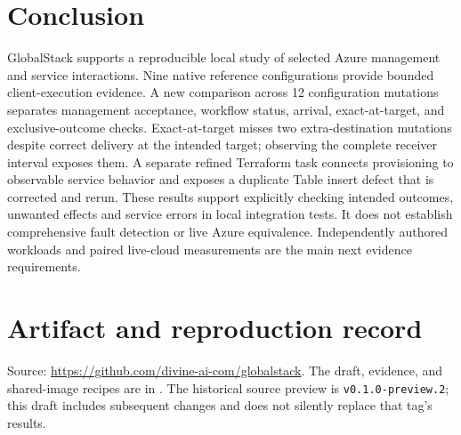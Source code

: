 \documentclass[10pt,a4paper]{article}
\begin{document}
\section{Conclusion}
GlobalStack supports a reproducible local study of selected Azure management and service interactions. Nine native reference configurations provide bounded client-execution evidence. A new comparison across 12 configuration mutations separates management acceptance, workflow status, arrival, exact-at-target, and exclusive-outcome checks. Exact-at-target misses two extra-destination mutations despite correct delivery at the intended target; observing the complete receiver interval exposes them. A separate refined Terraform task connects provisioning to observable service behavior and exposes a duplicate Table insert defect that is corrected and rerun. These results support explicitly checking intended outcomes, unwanted effects and service errors in local integration tests. It does not establish comprehensive fault detection or live Azure equivalence. Independently authored workloads and paired live-cloud measurements are the main next evidence requirements.

\appendix
\section{Artifact and reproduction record}
Source: \url{https://github.com/divine-ai-com/globalstack}. The draft, evidence, and shared-image recipes are in . The historical source preview is \texttt{v0.1.0-preview.2}; this draft includes subsequent changes and does not silently replace that tag's results.

\small

\normalsize
\end{document}

